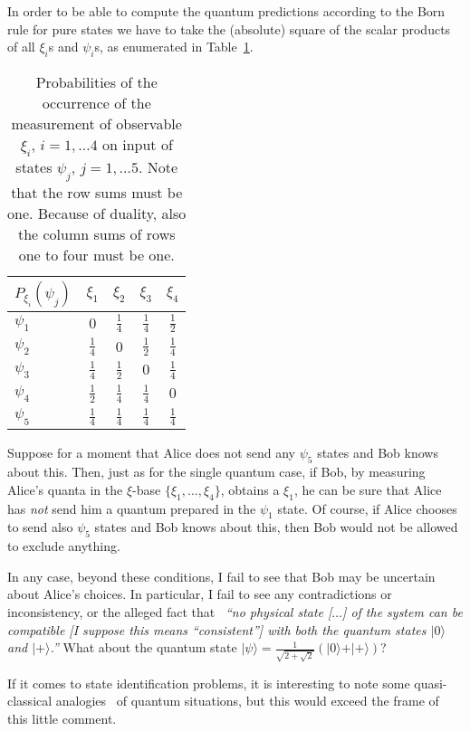 \documentclass[%
 preprint,
 showpacs,
 showkeys,
 preprintnumbers,
 amsmath,amssymb,
 aps,
 pra,
  longbibliography,
 ]{revtex4-1}
\begin{document}
In order to be able to compute the quantum predictions
according to the Born rule for pure states
we have to take the (absolute) square of the scalar products of all $\xi_i$s
and
$\psi_i$s, as enumerated in Table~\ref{2011-comment-rudolph-t1}.
\begin{table}
\begin{tabular}{lcccc}
\hline\hline
$P_{\xi_i}(\psi_j)$&$\xi_1$ &$\xi_2$&$\xi_3$&$\xi_4$\\
\hline
$\psi_1$&$0 $&$ \frac{1}{4} $&$ \frac{1}{4} $&$ \frac{1}{2} $\\
$\psi_2$&$\frac{1}{4} $&$ 0 $&$ \frac{1}{2} $&$ \frac{1}{4} $\\
$\psi_3$&$\frac{1}{4} $&$ \frac{1}{2} $&$ 0 $&$ \frac{1}{4} $\\
$\psi_4$&$\frac{1}{2} $&$ \frac{1}{4} $&$ \frac{1}{4} $&$ 0 $\\
\hline
$\psi_5$&$\frac{1}{4} $&$ \frac{1}{4} $&$ \frac{1}{4} $&$ \frac{1}{4}$  \\
\hline\hline
\end{tabular}
\caption{Probabilities of the occurrence of the measurement of observable $\xi_i$, $i=1,\ldots 4$
on input of states $\psi_j$, $j=1,\ldots 5$.
Note that the row sums must be one.
Because of duality,
also the column sums of rows one to four must be one. }
\label{2011-comment-rudolph-t1}
\end{table}

Suppose for a moment that Alice does not send any $\psi_5$ states
and Bob knows about this.
Then, just as for the single quantum case,
if Bob, by measuring Alice's quanta in the $\xi$-base $\{\xi_1,\ldots ,\xi_4\}$,
obtains a $\xi_1$,
he can be sure that Alice has {\em not} send him a quantum prepared in
the $\psi_1$ state.
Of course, if Alice chooses to send also $\psi_5$ states
and Bob knows about this, then Bob would not be allowed to exclude anything.

In any case, beyond these conditions, I fail to see that Bob may be uncertain
about Alice's choices.
In particular, I fail to see any contradictions or inconsistency,
or the alleged fact that~\cite{Pusey-arXiv:1111.3328}
{\em ``no physical state [$\ldots$]
of the system can be compatible [I suppose this means ``consistent'']
with both the quantum states
$
\vert 0 \rangle
$
and
$
\vert + \rangle
$.''}
What about the quantum state $ \vert \psi \rangle =\frac{1}{\sqrt{2+\sqrt{2}} }
\left( \vert 0 \rangle + \vert + \rangle \right) $?


If it comes to state identification problems, it is interesting to
note some quasi-classical analogies~\cite{e-f-moore,wright,svozil-2008-ql}
of quantum situations,
but this would exceed the frame of this little comment.
\end{document}
